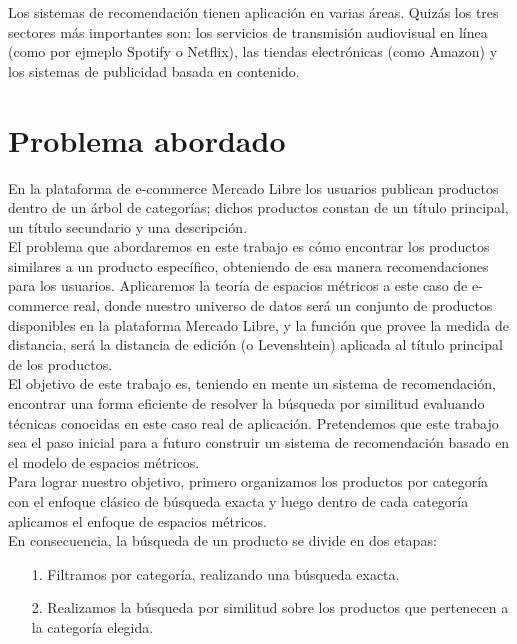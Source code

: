 Los sistemas de recomendaci\'on tienen aplicaci\'on en varias \'areas. Quiz\'as los tres sectores m\'as importantes son: los servicios de transmisi\'on audiovisual en l\'inea (como por ejmeplo Spotify o Netflix), las tiendas electr\'onicas (como Amazon) y los sistemas de publicidad basada en contenido.\\

\section{Problema abordado}

En la plataforma de e-commerce Mercado Libre los usuarios publican productos dentro de un \'arbol de categor\'ias; dichos productos constan de un t\'itulo principal, un t\'itulo secundario y una descripci\'on.\\

El problema que abordaremos en este trabajo es c\'omo encontrar los productos similares a un producto espec\'ifico, obteniendo de esa manera recomendaciones para los usuarios. Aplicaremos la teor\'ia de espacios m\'etricos a este caso de e-commerce real, donde nuestro universo de datos ser\'a un conjunto de productos disponibles en la plataforma Mercado Libre, y la funci\'on que provee la medida de distancia, ser\'a la distancia de edici\'on (o Levenshtein) aplicada al t\'itulo principal de los productos.\\

El objetivo de este trabajo es, teniendo en mente un sistema de recomendaci\'on, encontrar una forma eficiente de resolver la b\'usqueda por similitud  evaluando t\'ecnicas conocidas en este caso real de aplicaci\'on. Pretendemos que este trabajo sea el paso inicial para a futuro construir un sistema de recomendaci\'on basado en el modelo de espacios m\'etricos.\\

Para lograr nuestro objetivo, primero organizamos los productos por categor\'ia con el enfoque cl\'asico de b\'usqueda exacta y luego dentro de cada categor\'ia aplicamos el enfoque de espacios m\'etricos. \\

En consecuencia, la b\'usqueda de un producto se divide en dos etapas: 

\begin{itemize}
    \item [1.] Filtramos por categor\'ia, realizando una búsqueda exacta.
    \item [2.] Realizamos la b\'usqueda por similitud sobre los productos que pertenecen a la categor\'ia elegida.
 \end{itemize}
 
